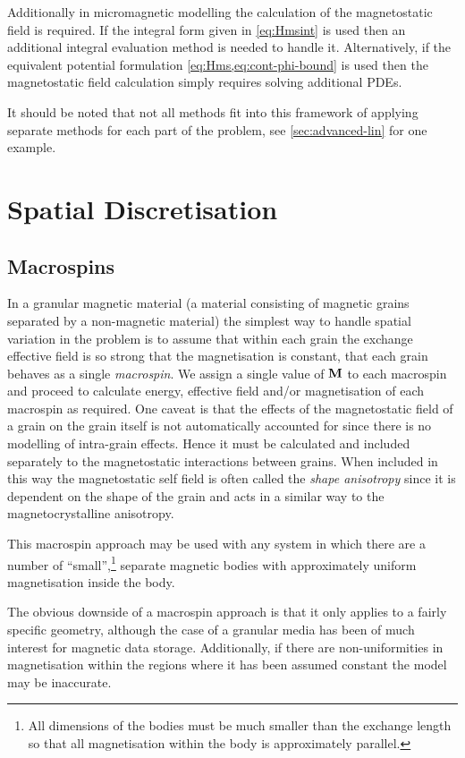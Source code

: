 Additionally in micromagnetic modelling the calculation of the magnetostatic field is required.
If the integral form given in \cref{eq:Hmsint} is used then an additional integral evaluation method is needed to handle it.
Alternatively, if the equivalent potential formulation \cref{eq:Hms,eq:cont-phi-bound} is used then the magnetostatic field calculation simply requires solving additional PDEs.

It should be noted that not all methods fit into this framework of applying separate methods for each part of the problem, see \cref{sec:advanced-lin} for one example.


\section{Spatial Discretisation}
\label{sec:spat-discr}

\subsection{Macrospins}
\label{sec:sd-macrospins}

In a granular magnetic material (a material consisting of magnetic grains separated by a non-magnetic material) the simplest way to handle spatial variation in the problem is to assume that within each grain the exchange effective field is so strong that the magnetisation is constant, \ie that each grain behaves as a single \emph{macrospin}.
We assign a single value of $\mathbf{M}$ to each macrospin and proceed to calculate energy, effective field and/or magnetisation of each macrospin as required.
One caveat is that the effects of the magnetostatic field of a grain on the grain itself is not automatically accounted for since there is no modelling of intra-grain effects.
Hence it must be calculated and included separately to the magnetostatic interactions between grains.
When included in this way the magnetostatic self field is often called the \emph{shape anisotropy} since it is dependent on the shape of the grain and acts in a similar way to the magnetocrystalline anisotropy. 

This macrospin approach may be used with any system in which there are a number of ``small'',\footnote{All dimensions of the bodies must be much smaller than the exchange length so that all magnetisation within the body is approximately parallel.} separate magnetic bodies with approximately uniform magnetisation inside the body.

The obvious downside of a macrospin approach is that it only applies to a fairly specific geometry, although the case of a granular media has been of much interest for magnetic data storage. 
Additionally, if there are non-uniformities in magnetisation within the regions where it has been assumed constant the model may be inaccurate.

